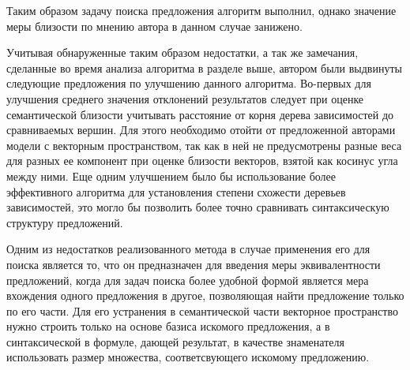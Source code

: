Таким образом задачу поиска предложения алгоритм выполнил, однако значение меры близости
по мнению автора в данном случае занижено.

Учитывая обнаруженные таким образом недостатки, а так же замечания, 
сделанные во время анализа алгоритма в разделе выше, автором были
выдвинуты следующие предложения по улучшению данного алгоритма.
Во-первых для улучшения среднего значения отклонений результатов следует
при оценке семантической близости учитывать расстояние от корня дерева зависимостей
до сравниваемых вершин. Для этого необходимо отойти от предложенной авторами модели с векторным пространством,
так как в ней не предусмотрены разные веса для разных ее компонент при оценке близости векторов, взятой как косинус угла между ними.
Еще одним улучшением было бы использование более эффективного алгоритма для установления
степени схожести деревьев зависимостей, это могло бы позволить более точно сравнивать
синтаксическую структуру предложений. 

Одним из недостатков реализованного метода в случае применения его для поиска 
является то, что он предназначен для введения меры эквивалентности предложений, когда для задач поиска
более удобной формой является мера вхождения одного предложения в другое, позволяющая найти предложение только по его части.
Для его устранения в семантической части векторное пространство нужно строить только на основе базиса искомого предложения,
а в синтаксической в формуле, дающей результат, в качестве знаменателя использовать размер множества,
соответсвующего искомому предложению.


